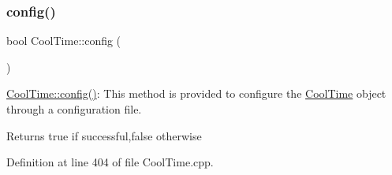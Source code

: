 \subsubsection{\texorpdfstring{config()}{config()}\hspace{0.1cm}{\footnotesize\ttfamily [1/2]}}
{\footnotesize\ttfamily bool Cool\+Time\+::config (\begin{DoxyParamCaption}{ }\end{DoxyParamCaption})}

\hyperlink{class_cool_time_a87c28260c1bc77091162cbcf1ee2e129}{Cool\+Time\+::config()}\+: This method is provided to configure the \hyperlink{class_cool_time}{Cool\+Time} object through a configuration file.

\begin{DoxyReturn}{Returns}
true if successful,false otherwise 
\end{DoxyReturn}


Definition at line 404 of file Cool\+Time.\+cpp.



